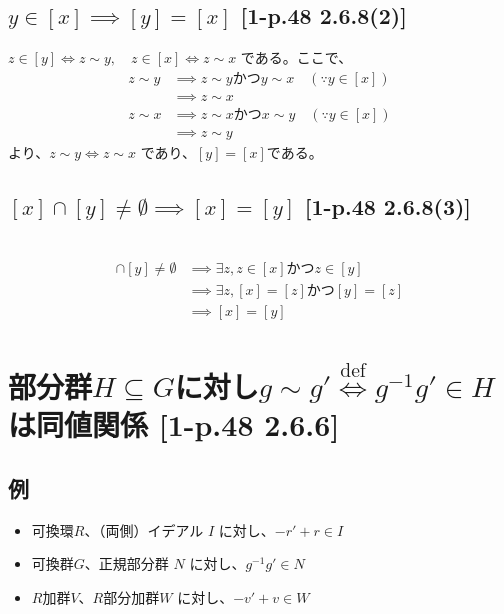 \documentclass[twocolumn]{jsarticle}
\newcommand{\inv}[1]{#1^{-1}}
\newcommand{\iffdef}{\stackrel{\text{def}}{\iff}}
\begin{document}
\subsection{\(y \in [x] \implies [y] = [x]\) [1-p.48 2.6.8(2)]}
\(z \in [y] \iff z \sim y,\quad z \in [x] \iff z \sim x\) である。ここで、
\begin{align*}
z \sim y
&\implies z \sim y かつ y \sim x \quad(\because y \in [x]) \\
&\implies z \sim x \\
z \sim x
&\implies z \sim x かつ x \sim y \quad(\because y \in [x]) \\
&\implies z \sim y
\end{align*}
より、\(z \sim y \iff z \sim x\) であり、\([y] = [x]\)である。

\subsection{\([x] \cap [y] \neq \emptyset \implies [x] = [y]\) [1-p.48 2.6.8(3)]}
\:\\[-12mm]
\begin{align*}
[x] \cap [y] \neq \emptyset 
&\implies \exists z, z \in [x] かつ z \in [y] \\
&\implies \exists z, [x] = [z] かつ [y] = [z] \\
&\implies [x] = [y]
\end{align*}

\section{部分群\(H\subseteq G\)に対し\(g \sim g' \iffdef \inv{g}g' \in H\) は同値関係 [1-p.48 2.6.6]}
\subsection{例}
\begin{itemize}
    \item 可換環\(R\)、（両側）イデアル \(I\) に対し、\(-r'+r\in I\)
    \item 可換群\(G\)、正規部分群 \(N\) に対し、\(\inv{g}g' \in N\)
    \item \(R\)加群\(V\)、\(R\)部分加群\(W\) に対し、\(-v'+v\in W\)
\end{itemize}
\end{document}
